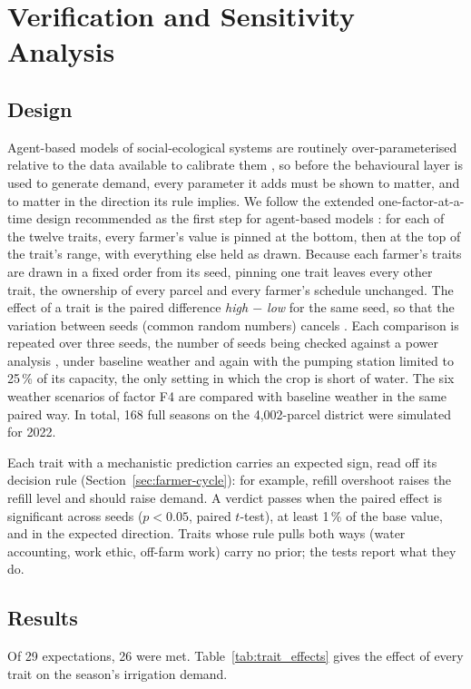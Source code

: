 \documentclass{article}
\begin{document}
\section{Verification and Sensitivity Analysis}
\label{sec:verification}
\begin{added}
\subsection{Design}
Agent-based models of social-ecological systems are routinely over-parameterised relative to the data available to calibrate them \cite{TroostBerger2015}, so before the behavioural layer is used to generate demand, every parameter it adds must be shown to matter, and to matter in the direction its rule implies. We follow the extended one-factor-at-a-time design recommended as the first step for agent-based models \cite{tenBroeke2016}: for each of the twelve traits, every farmer's value is pinned at the bottom, then at the top of the trait's range, with everything else held as drawn. Because each farmer's traits are drawn in a fixed order from its seed, pinning one trait leaves every other trait, the ownership of every parcel and every farmer's schedule unchanged. The effect of a trait is the paired difference \emph{high $-$ low} for the same seed, so that the variation between seeds (common random numbers) cancels \cite{Lee2015Output}. Each comparison is repeated over three seeds, the number of seeds being checked against a power analysis \cite{SeriSecchi2017}, under baseline weather and again with the pumping station limited to 25\,\% of its capacity, the only setting in which the crop is short of water. The six weather scenarios of factor F4 are compared with baseline weather in the same paired way. In total, 168 full seasons on the 4,002-parcel district were simulated for 2022.

Each trait with a mechanistic prediction carries an expected sign, read off its decision rule (Section~\ref{sec:farmer-cycle}): for example, refill overshoot raises the refill level and should raise demand. A verdict passes when the paired effect is significant across seeds ($p<0.05$, paired $t$-test), at least 1\,\% of the base value, and in the expected direction. Traits whose rule pulls both ways (water accounting, work ethic, off-farm work) carry no prior; the tests report what they do.

\subsection{Results}
Of 29 expectations, 26 were met. Table~\ref{tab:trait_effects} gives the effect of every trait on the season's irrigation demand.


\end{added}
\end{document}
